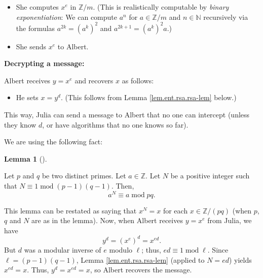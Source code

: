 \documentclass[numbers=enddot,12pt,final,onecolumn,notitlepage]{scrartcl}%
\numberwithin{exer}{subsection}
\theoremstyle{definition}
\newtheorem{lem}[theo]{Lemma}
\newenvironment{lemma}[1][]
{\begin{lem}[#1]\begin{leftbar}}
{\end{leftbar}\end{lem}}
\begin{document}
\begin{itemize}
\item She computes $x^{e}$ in $\mathbb{Z}/m$. (This is realistically
computable by \textit{binary exponentiation}: We can compute $a^{n}$ for
$a\in\mathbb{Z}/m$ and $n\in\mathbb{N}$ recursively via the formulas
$a^{2k}=\left(  a^{k}\right)  ^{2}$ and $a^{2k+1}=\left(  a^{k}\right)  ^{2}a$.)

\item She sends $x^{e}$ to Albert.
\end{itemize}

\textbf{Decrypting a message:}

Albert receives $y=x^{e}$ and recovers $x$ as follows:

\begin{itemize}
\item He sets $x=y^{d}$. (This follows from Lemma \ref{lem.ent.rsa.rsa-lem} below.)
\end{itemize}

This way, Julia can send a message to Albert that no one can intercept (unless
they know $d$, or have algorithms that no one knows so far).

We are using the following fact:

\begin{lemma}
\label{lem.ent.rsa.rsa-lem}Let $p$ and $q$ be two distinct primes. Let
$a\in\mathbb{Z}$. Let $N$ be a positive integer such that $N\equiv
1\operatorname{mod}\left(  p-1\right)  \left(  q-1\right)  $. Then,%
\[
a^{N}\equiv a\operatorname{mod}pq.
\]

\end{lemma}

This lemma can be restated as saying that $x^{N}=x$ for each $x\in
\mathbb{Z}/\left(  pq\right)  $ (when $p$, $q$ and $N$ are as in the lemma).
Now, when Albert receives $y=x^{e}$ from Julia, we have%
\[
y^{d}=\left(  x^{e}\right)  ^{d}=x^{ed}.
\]
But $d$ was a modular inverse of $e$ modulo $\ell$; thus, $ed\equiv
1\operatorname{mod}\ell$. Since $\ell=\left(  p-1\right)  \left(  q-1\right)
$, Lemma \ref{lem.ent.rsa.rsa-lem} (applied to $N=ed$) yields $x^{ed}=x$.
Thus, $y^{d}=x^{ed}=x$, so Albert recovers the message.
\end{document}
